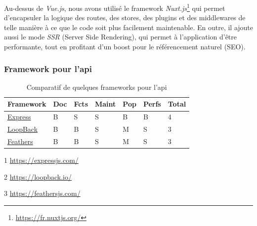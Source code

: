 \renewcommand{\thefootnote}{\alph{footnote}}

Au-dessus de \textit{Vue.js}, nous avons utilisé le framework \textit{Nuxt.js}\footnote{\url{https://fr.nuxtjs.org/}} qui permet d'encapsuler la logique des routes, des stores, des plugins et des middlewares de telle manière à ce que le code soit plus facilement maintenable. En outre, il ajoute aussi le mode \textit{SSR} (Server Side Rendering), qui permet à l'application d'être performante, tout en profitant d'un boost pour le référencement naturel (SEO).

\renewcommand{\thefootnote}{\arabic{footnote}}

\subsubsection*{Framework pour l'\Gls{api}}


\begin{table}[H]
    \centering
    \begin{threeparttable}
    \begin{tabular}{| l | l | l | l | l | l | l |}
    \hline
        Framework & Doc & Fcts & Maint & Pop & Perfs & Total \\
    \hline
        \href{https://expressjs.com/}{Express}\tnote{1} &
        B &  
        S &
        S &            
        B &              
        B &
        4 \\
    \hline
        \href{https://loopback.io/}{LoopBack}\tnote{2} &
        B &                
        B &   
        S &
        M &              
        S &      
        3 \\
    \hline
        \href{https://feathersjs.com/}{Feathers}\tnote{3} &
        B &                
        B &     
        S &
        M &              
        S &       
        3 \\  
    \hline
    \end{tabular}
    \begin{tablenotes}
        \item[1] \url{https://expressjs.com/}
        \item[2] \url{https://loopback.io/}
        \item[3] \url{https://feathersjs.com/}
    \end{tablenotes}
    \end{threeparttable}
    \caption{Comparatif de quelques frameworks pour l'\Gls{api}}
    \label{table:compFrameworksAPI}
\end{table}

